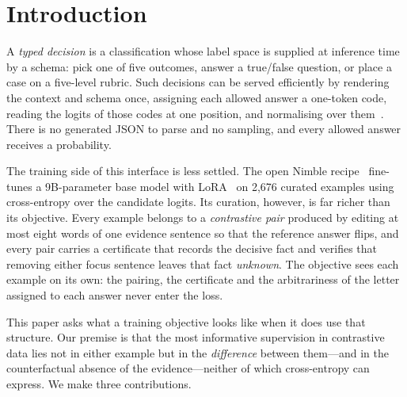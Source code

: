 \documentclass[conference]{IEEEtran}
\begin{document}
\section{Introduction}
\label{sec:intro}

A \emph{typed decision} is a classification whose label space is supplied at
inference time by a schema: pick one of five outcomes, answer a true/false
question, or place a case on a five-level rubric. Such decisions can be served
efficiently by rendering the context and schema once, assigning each allowed
answer a one-token code, reading the logits of those codes at one position, and
normalising over them~\cite{rogge2026,nimble2026}. There is no generated JSON to
parse and no sampling, and every allowed answer receives a probability.

The training side of this interface is less settled. The open Nimble
recipe~\cite{nimble2026} fine-tunes a 9B-parameter base model with
LoRA~\cite{hu2022lora} on 2{,}676 curated examples using cross-entropy over the
candidate logits. Its curation, however, is far richer than its objective.
Every example belongs to a \emph{contrastive pair} produced by editing at most
eight words of one evidence sentence so that the reference answer flips, and
every pair carries a certificate that records the decisive fact and verifies
that removing either focus sentence leaves that fact \emph{unknown}. The
objective sees each example on its own: the pairing, the certificate and the
arbitrariness of the letter assigned to each answer never enter the loss.

This paper asks what a training objective looks like when it does use that
structure. Our premise is that the most informative supervision in contrastive
data lies not in either example but in the \emph{difference} between
them---and in the counterfactual absence of the evidence---neither of which
cross-entropy can express. We make three contributions.
\end{document}
